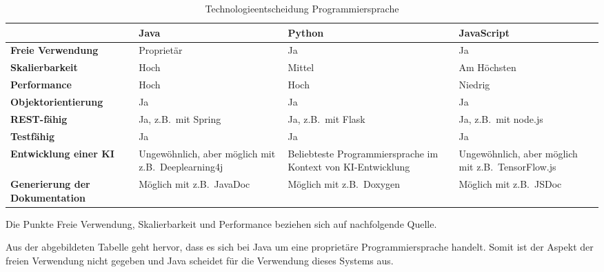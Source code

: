\begin{table}
    \begin{tabularx}{\textwidth}{l|X|X|X}
        & \textbf{Java} & \textbf{Python} & \textbf{JavaScript} \\ \hline
        \textbf{Freie Verwendung} & \cellcolor{red!30} Proprietär & \cellcolor{green!30}Ja & \cellcolor{green!30}Ja \\ \hline
        \textbf{Skalierbarkeit} & \cellcolor{green!30}Hoch & \cellcolor{orange!30}Mittel & \cellcolor{green!30}Am Höchsten \\ \hline
        \textbf{Performance} & \cellcolor{green!30}Hoch & \cellcolor{green!30}Hoch & \cellcolor{red!30}Niedrig \\ \hline
        \textbf{Objektorientierung} & \cellcolor{green!30}Ja & \cellcolor{green!30}Ja & \cellcolor{green!30}Ja \\ \hline
        \textbf{REST-fähig} & \cellcolor{green!30}Ja, z.B.\ mit Spring & \cellcolor{green!30}Ja, z.B.\ mit Flask & \cellcolor{green!30}Ja, z.B.\ mit node.js \\ \hline
        \textbf{Testfähig} & \cellcolor{green!30}Ja & \cellcolor{green!30}Ja & \cellcolor{green!30}Ja \\ \hline
        \textbf{Entwicklung einer KI} & \cellcolor{orange!30}Ungewöhnlich, aber möglich mit z.B.\ Deeplearning4j & \cellcolor{green!30}Beliebteste Programmiersprache im Kontext von KI-Entwicklung & \cellcolor{orange!30}Ungewöhnlich, aber möglich mit z.B.\ TensorFlow.js \\ \hline
        \textbf{Generierung der Dokumentation} & \cellcolor{green!30}Möglich mit z.B.\ JavaDoc & \cellcolor{green!30}Möglich mit z.B.\ Doxygen & \cellcolor{green!30}Möglich mit z.B.\ JSDoc \\
    \end{tabularx}
    \caption{Technologieentscheidung Programmiersprache}
    \label{tab:technologieentscheidung-programmiersprache}
\end{table}
Die Punkte Freie Verwendung, Skalierbarkeit und Performance beziehen sich auf nachfolgende Quelle\autocite{nodejavapython}.

Aus der abgebildeten Tabelle geht hervor, dass es sich bei Java um eine proprietäre Programmiersprache handelt.
Somit ist der Aspekt der freien Verwendung nicht gegeben und Java scheidet für die Verwendung dieses Systems aus.

